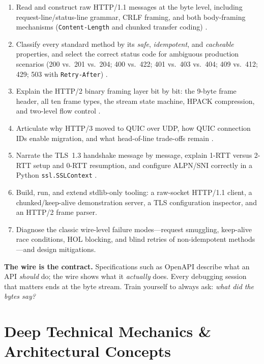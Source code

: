 \begin{enumerate}[label=\textbf{LO1.\arabic*}, leftmargin=3.2em]
  \item Read and construct raw HTTP/1.1 messages at the byte level, including request-line/status-line grammar, CRLF framing, and both body-framing mechanisms (\texttt{Content-Length} and chunked transfer coding) \cite{rfc9112}.
  \item Classify every standard method by its \emph{safe}, \emph{idempotent}, and \emph{cacheable} properties, and select the correct status code for ambiguous production scenarios (200 vs.\ 201 vs.\ 204; 400 vs.\ 422; 401 vs.\ 403 vs.\ 404; 409 vs.\ 412; 429; 503 with \texttt{Retry-After}) \cite{rfc9110}.
  \item Explain the HTTP/2 binary framing layer bit by bit: the 9-byte frame header, all ten frame types, the stream state machine, HPACK compression, and two-level flow control \cite{rfc9113,rfc7541}.
  \item Articulate why HTTP/3 moved to QUIC over UDP, how QUIC connection IDs enable migration, and what head-of-line trade-offs remain \cite{rfc9114,rfc9000}.
  \item Narrate the TLS~1.3 handshake message by message, explain 1-RTT versus 2-RTT setup and 0-RTT resumption, and configure ALPN/SNI correctly in a Python \texttt{ssl.SSLContext} \cite{rfc8446}.
  \item Build, run, and extend stdlib-only tooling: a raw-socket HTTP/1.1 client, a chunked/keep-alive demonstration server, a TLS configuration inspector, and an HTTP/2 frame parser.
  \item Diagnose the classic wire-level failure modes---request smuggling, keep-alive race conditions, HOL blocking, and blind retries of non-idempotent methods---and design mitigations.
\end{enumerate}

\begin{keyconceptbox}
\textbf{The wire is the contract.} Specifications such as OpenAPI describe what an API \emph{should} do; the wire shows what it \emph{actually} does. Every debugging session that matters ends at the byte stream. Train yourself to always ask: \emph{what did the bytes say?}
\end{keyconceptbox}

\section{Deep Technical Mechanics \& Architectural Concepts}

